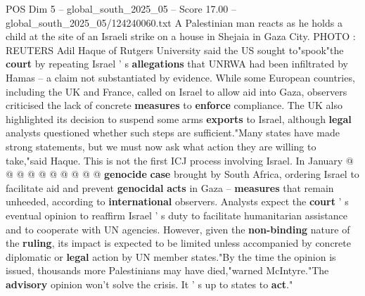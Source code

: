 \begin{textsample}{POS Dim 5 – global\_south\_2025\_05 – Score 17.00 – global\_south\_2025\_05/124240060.txt}
A Palestinian man reacts as he holds a child at the site of an Israeli strike on a house in Shejaia in Gaza City.
PHOTO : REUTERS Adil Haque of Rutgers University said the US sought to"spook"the \textbf{court} by repeating Israel ' s \textbf{allegations} that UNRWA had been infiltrated by Hamas -- a claim not substantiated by evidence.
While some European countries, including the UK and France, called on Israel to allow aid into Gaza, observers criticised the lack of concrete \textbf{measures} to \textbf{enforce} compliance.
The UK also highlighted its decision to suspend some arms \textbf{exports} to Israel, although \textbf{legal} analysts questioned whether such steps are sufficient."Many states have made strong statements, but we must now ask what action they are willing to take,"said Haque.
This is not the first ICJ process involving Israel.
In January @ @ @ @ @ @ @ @ @ @ \textbf{genocide} \textbf{case} brought by South Africa, ordering Israel to facilitate aid and prevent \textbf{genocidal} \textbf{acts} in Gaza -- \textbf{measures} that remain unheeded, according to \textbf{international} observers.
Analysts expect the \textbf{court} ' s eventual opinion to reaffirm Israel ' s duty to facilitate humanitarian assistance and to cooperate with UN agencies.
However, given the \textbf{non-binding} nature of the \textbf{ruling}, its impact is expected to be limited unless accompanied by concrete diplomatic or \textbf{legal} action by UN member states."By the time the opinion is issued, thousands more Palestinians may have died,"warned McIntyre."The \textbf{advisory} opinion won't solve the crisis.
It ' s up to states to \textbf{act}."

\end{textsample}
